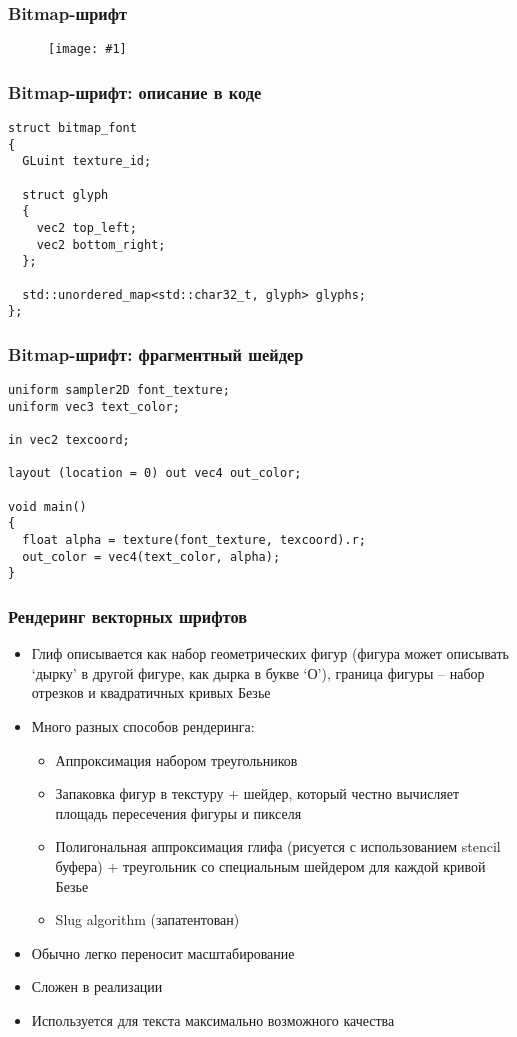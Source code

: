 \documentclass{beamer}
\newcommand{\slideimage}[1]{
  \begin{figure}
    \begin{adjustbox}{width=\textwidth, totalheight=\textheight-2\baselineskip-2\baselineskip,keepaspectratio}
      \texttt{[image: \#1]}
    \end{adjustbox}
  \end{figure}
}
\begin{document}
\begin{frame}[fragile]
\frametitle{Bitmap-шрифт}
\slideimage{bitmap-font.png}
\end{frame}

\begin{frame}[fragile]
\frametitle{Bitmap-шрифт: описание в коде}
\begin{verbatim}
struct bitmap_font
{
  GLuint texture_id;

  struct glyph
  {
    vec2 top_left;
    vec2 bottom_right;
  };

  std::unordered_map<std::char32_t, glyph> glyphs;
};
\end{verbatim}
\end{frame}

\begin{frame}[fragile]
\frametitle{Bitmap-шрифт: фрагментный шейдер}
\begin{verbatim}
uniform sampler2D font_texture;
uniform vec3 text_color;

in vec2 texcoord;

layout (location = 0) out vec4 out_color;

void main()
{
  float alpha = texture(font_texture, texcoord).r;
  out_color = vec4(text_color, alpha);
}
\end{verbatim}
\end{frame}

\begin{frame}[fragile]
\frametitle{Рендеринг векторных шрифтов}
\begin{itemize}
\item Глиф описывается как набор геометрических фигур (фигура может описывать `дырку' в другой фигуре, как дырка в букве `О'), граница фигуры -- набор отрезков и квадратичных кривых Безье
\pause
\item Много разных способов рендеринга:
\pause
\begin{itemize}
\item Аппроксимация набором треугольников
\pause
\item Запаковка фигур в текстуру + шейдер, который честно вычисляет площадь пересечения фигуры и пикселя
\pause
\item Полигональная аппроксимация глифа (рисуется с использованием stencil буфера) + треугольник со специальным шейдером для каждой кривой Безье
\pause
\item Slug algorithm (запатентован)
\end{itemize}
\pause
\item Обычно легко переносит масштабирование
\pause
\item Сложен в реализации
\pause
\item Используется для текста максимально возможного качества
\end{itemize}
\end{frame}
\end{document}
